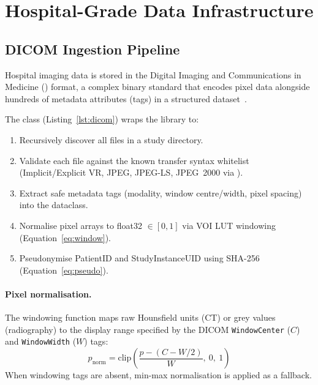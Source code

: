 \section{Hospital-Grade Data Infrastructure}
\label{sec:data_infra}

\subsection{DICOM Ingestion Pipeline}
\label{sec:dicom}

Hospital imaging data is stored in the Digital Imaging and Communications
in Medicine (\dicom) format, a complex binary standard that encodes pixel
data alongside hundreds of metadata attributes (tags) in a structured
dataset~\citep{dicom2023}.

The  class (Listing~\ref{lst:dicom}) wraps the
 library to:
\begin{enumerate}
  \item Recursively discover all  files in a study directory.
  \item Validate each file against the known transfer syntax whitelist
        (Implicit/Explicit VR, JPEG, JPEG-LS, JPEG~2000 via ).
  \item Extract safe metadata tags (modality, window centre/width, pixel
        spacing) into the  dataclass.
  \item Normalise pixel arrays to float32 $\in [0,1]$ via VOI LUT windowing
        (Equation~\ref{eq:window}).
  \item Pseudonymise PatientID and StudyInstanceUID using SHA-256
        (Equation~\ref{eq:pseudo}).
\end{enumerate}

\paragraph{Pixel normalisation.}
The windowing function maps raw Hounsfield units (CT) or grey values
(radiography) to the display range specified by the DICOM
\texttt{WindowCenter} ($C$) and \texttt{WindowWidth} ($W$) tags:
\begin{equation}
  p_{\mathrm{norm}} = \mathrm{clip}\!\left(
    \frac{p - \left(C - W/2\right)}{W},\ 0,\ 1
  \right)
  \label{eq:window}
\end{equation}
When windowing tags are absent, min-max normalisation is applied as a
fallback.

